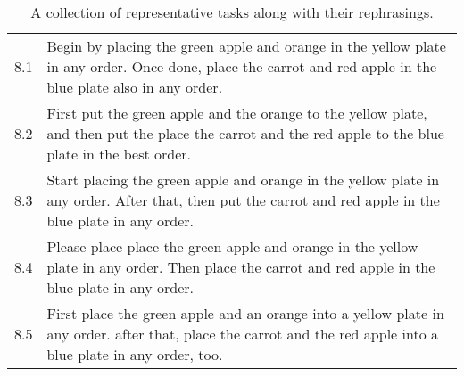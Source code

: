 \documentclass{article}
\begin{document}
\begin{table*}[!tbh]
\begin{tabular}{cp{14cm}}
       \hline
8.1 & Begin by placing the green apple and orange in the yellow plate in any order. Once done, place the carrot and red apple in the blue plate also in any order. \\
8.2 & First put the green apple and the orange to the yellow plate, and then put the place the carrot and the red apple to the blue plate in the best order.\\
8.3 &Start placing the green apple and orange in the yellow plate in any order. After that, then put the carrot and red apple in the blue plate in any order.\\
8.4 & Please place place the green apple and orange in the yellow plate in any order. Then place the carrot and red apple in the blue plate in any order.\\
8.5 & First place the green apple and an orange into a yellow plate in any order. after that, place the carrot and the red apple into a blue plate in any order, too. \\
         \bottomrule
    \end{tabular}
    \caption{A collection of representative tasks along with their rephrasings.}
    \label{tab:real-world-rephrase}
\end{table*}
\end{document}
